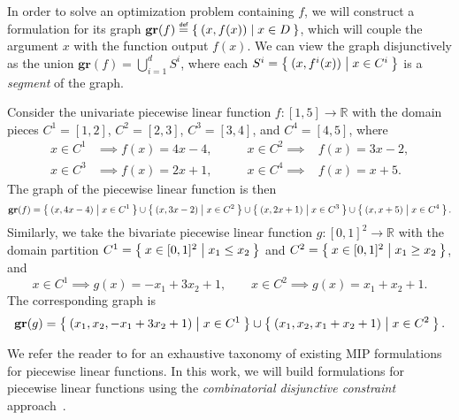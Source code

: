 \documentclass[opre,nonblindrev]{informs3} %
\newcommand{\bbR}{\mathbb{R}}
\newcommand{\gr}{\textbf{gr}}
\newcommand\defeq{\mathrel{\overset{\makebox[0pt]{\mbox{\normalfont\tiny\sffamily def}}}{=}}}
\begin{document}
In order to solve an optimization problem containing $f$, we will construct a formulation for its graph $\gr(f) \defeq \Set{(x,f(x)) | x \in D }$, which will couple the argument $x$ with the function output $f(x)$. We can view the graph disjunctively as the union $\gr(f) = \bigcup_{i=1}^d S^i$, where each $S^i = \Set{ (x,f^i(x)) | x \in C^i }$ is a \emph{segment} of the graph.

\begin{example}\label{startex}
  Consider the univariate piecewise linear function $f : [1,5] \to \bbR$ with the domain pieces $C^1=[1,2]$, $C^2=[2,3]$, $C^3=[3,4]$, and $C^4=[4,5]$, where
  \begin{subequations} \label{eqn:pwl-example}
  \begin{alignat}{3}
      x \in C^1 &\implies f(x) = 4x-4,   \quad\quad &x \in C^2 \implies& f(x) = 3x-2, \\
      x \in C^3 &\implies f(x) = 2x+1, \quad\quad &x \in C^4 \implies& f(x) = x+5.
  \end{alignat}
  \end{subequations}
The graph of the piecewise linear function is then
    \[
        \gr(f) = \Set{(x,4x-4) | x \in C^1 } \cup \Set{(x,3x-2) | x \in C^2 } \cup \Set{(x,2x+1) | x \in C^3 } \cup \Set{(x,x+5) | x \in C^4}.
    \]
    Similarly, we take the bivariate piecewise linear function $g : [0,1]^2 \to \bbR$ with the domain partition $C^1 = \Set{x \in [0,1]^2 | x_1 \leq x_2 }$ and $C^2 = \Set{x \in [0,1]^2 | x_1 \geq x_2 }$, and
  	\begin{equation}\label{eqn:bivariate-pwl-example}
      x \in C^1 \implies g(x) = -x_1+3x_2+1, \quad\quad x \in C^2 \implies g(x) = x_1+x_2+1.
  	\end{equation}
	The corresponding graph is
  \[
  	  \gr(g) = \Set{(x_1,x_2,-x_1+3x_2+1) | x \in C^1 } \cup \Set{(x_1,x_2,x_1+x_2+1) | x \in C^2 }.
  \]
\end{example}

We refer the reader to \cite{Vielma:2010} for an exhaustive taxonomy of existing MIP formulations for piecewise linear functions. In this work, we will build formulations for piecewise linear functions using the \emph{combinatorial disjunctive constraint} approach~\citep{Huchette:2016a}.
\end{document}
